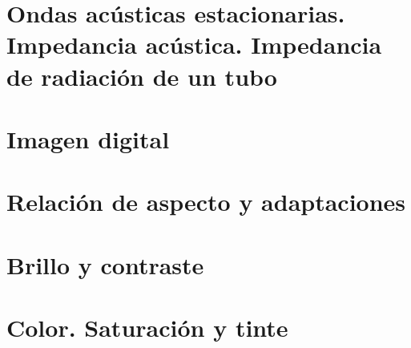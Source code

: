 \documentclass[a4paper]{book}
\begin{document}
\section{Ondas acústicas estacionarias. Impedancia acústica. Impedancia de radiación de un tubo}
\section{Imagen digital}
\section{Relación de aspecto y adaptaciones}
\section{Brillo y contraste}
\section{Color. Saturación y tinte}


% 
\end{document}
